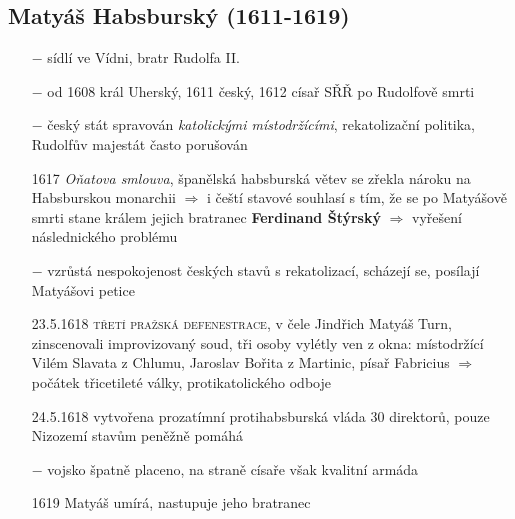 \documentclass{article}
\begin{document}
\subsection*{Matyáš Habsburský (1611-1619)}
\begin{itemize}
    \vspace{-0.5em}
    \setlength\itemsep{0.15em}
    \item[$-$] sídlí ve Vídni, bratr Rudolfa II.
    \item[$-$] od 1608 král Uherský, 1611 český, 1612 císař SŘŘ po Rudolfově smrti
    \item[$-$] český stát spravován \textit{katolickými místodržícími}, rekatolizační politika, Rudolfův majestát často porušován
    \item[1617] \textit{Oňatova smlouva}, španělská habsburská větev se zřekla nároku na Habsburskou monarchii $\Rightarrow$ i čeští stavové souhlasí s tím, že se po Matyášově smrti stane králem jejich bratranec \textbf{Ferdinand Štýrský} $\Rightarrow$ vyřešení následnického problému
    \item[$-$]  vzrůstá nespokojenost českých stavů s rekatolizací, scházejí se, posílají Matyášovi petice
    \item[23.5.1618] \textsc{třetí pražská defenestrace}, v čele Jindřich Matyáš Turn, zinscenovali improvizovaný soud, tři osoby vylétly ven z okna: místodržící Vilém Slavata z Chlumu, Jaroslav Bořita z Martinic, písař Fabricius $\Rightarrow$  počátek třicetileté války, protikatolického odboje
    \item[24.5.1618] vytvořena prozatímní protihabsburská vláda 30 direktorů, pouze Nizozemí stavům peněžně pomáhá
    \item[$-$] vojsko špatně placeno, na straně císaře však kvalitní armáda
    \item[1619] Matyáš umírá, nastupuje jeho bratranec
\end{itemize}
\end{document}

